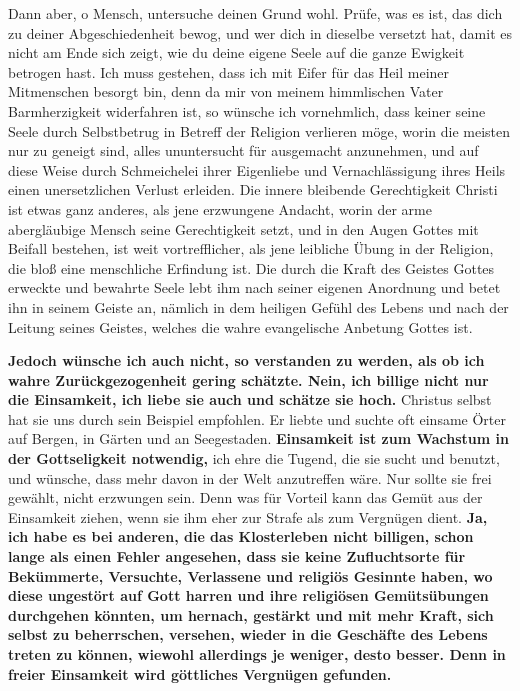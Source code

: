 Dann aber, o Mensch, untersuche deinen Grund wohl. Prüfe, was es ist, das dich
zu deiner Abgeschiedenheit bewog, und wer dich in dieselbe versetzt hat, damit
es nicht am Ende sich zeigt, wie du deine eigene Seele auf die ganze Ewigkeit
betrogen hast. Ich muss gestehen, dass ich mit
Eifer für das Heil meiner
Mitmenschen besorgt bin, denn da mir von meinem himmlischen Vater
Barmherzigkeit widerfahren ist, so wünsche ich vornehmlich, dass keiner seine
Seele durch Selbstbetrug in Betreff der Religion verlieren möge, worin die
meisten nur zu geneigt sind, alles ununtersucht für ausgemacht anzunehmen, und
auf diese Weise durch Schmeichelei ihrer Eigenliebe und Vernachlässigung ihres
Heils einen unersetzlichen Verlust erleiden. Die innere bleibende Gerechtigkeit
Christi ist etwas ganz anderes, als jene erzwungene Andacht, worin der arme
abergläubige Mensch seine Gerechtigkeit setzt, und in den Augen Gottes mit
Beifall bestehen, ist weit vortrefflicher, als jene leibliche Übung in der
Religion, die bloß eine menschliche Erfindung ist. Die durch die Kraft des
Geistes Gottes erweckte und bewahrte Seele lebt ihm nach seiner eigenen
Anordnung und betet ihn in seinem Geiste an, nämlich in dem heiligen Gefühl
des Lebens und nach der Leitung seines Geistes, welches die wahre evangelische
Anbetung Gottes ist.

\medskip

 \textbf{Jedoch wünsche ich auch nicht, so verstanden
zu werden, als ob ich wahre
Zurückgezogenheit gering schätzte. Nein, ich billige nicht nur die Einsamkeit,
ich liebe sie auch und schätze sie hoch.} Christus selbst hat sie uns durch
sein Beispiel empfohlen. Er liebte und suchte oft einsame Örter auf Bergen, in
Gärten und an Seegestaden. \textbf{Einsamkeit ist zum Wachstum in der
Gottseligkeit
notwendig,} ich ehre die Tugend, die sie sucht und benutzt, und wünsche, dass
mehr davon in der Welt anzutreffen wäre. Nur sollte sie frei gewählt, nicht
erzwungen sein. Denn was für Vorteil kann das Gemüt aus der Einsamkeit ziehen,
wenn sie ihm eher zur Strafe als zum Vergnügen dient. \textbf{Ja, ich habe es
bei
anderen, die das Klosterleben nicht billigen, schon lange
als einen Fehler
angesehen, dass sie keine Zufluchtsorte für Bekümmerte,
Versuchte, Verlassene
und religiös Gesinnte haben, wo diese ungestört auf Gott harren und ihre
religiösen Gemütsübungen durchgehen könnten, um hernach, gestärkt und mit mehr
Kraft, sich selbst zu beherrschen, versehen, wieder in die Geschäfte des Lebens
treten zu können, wiewohl allerdings je weniger, desto besser. Denn in freier
Einsamkeit wird göttliches Vergnügen gefunden.}
\label{ref:05_13_zurueckgezogenheit_ende}

